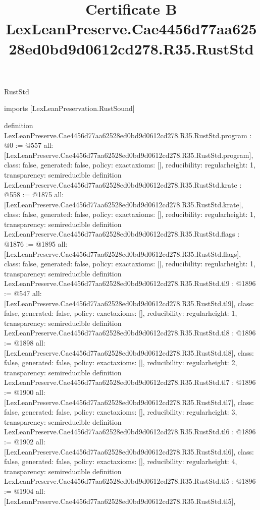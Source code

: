 \begin{lexlean}{RustStd}
\title{Certificate B LexLeanPreserve.Cae4456d77aa62528ed0bd9d0612cd278.R35.RustStd}
\begin{coremodule}
imports [LexLeanPreservation.RustSound]

definition LexLeanPreserve.Cae4456d77aa62528ed0bd9d0612cd278.R35.RustStd.program : @0 := @557 {
  all: [LexLeanPreserve.Cae4456d77aa62528ed0bd9d0612cd278.R35.RustStd.program],
  class: false,
  generated: false,
  policy: exact{axioms: []},
  reducibility: regular{height: 1},
  transparency: semireducible
}
definition LexLeanPreserve.Cae4456d77aa62528ed0bd9d0612cd278.R35.RustStd.krate : @558 := @1875 {
  all: [LexLeanPreserve.Cae4456d77aa62528ed0bd9d0612cd278.R35.RustStd.krate],
  class: false,
  generated: false,
  policy: exact{axioms: []},
  reducibility: regular{height: 1},
  transparency: semireducible
}
definition LexLeanPreserve.Cae4456d77aa62528ed0bd9d0612cd278.R35.RustStd.flags : @1876 := @1895 {
  all: [LexLeanPreserve.Cae4456d77aa62528ed0bd9d0612cd278.R35.RustStd.flags],
  class: false,
  generated: false,
  policy: exact{axioms: []},
  reducibility: regular{height: 1},
  transparency: semireducible
}
definition LexLeanPreserve.Cae4456d77aa62528ed0bd9d0612cd278.R35.RustStd.tl9 : @1896 := @547 {
  all: [LexLeanPreserve.Cae4456d77aa62528ed0bd9d0612cd278.R35.RustStd.tl9],
  class: false,
  generated: false,
  policy: exact{axioms: []},
  reducibility: regular{height: 1},
  transparency: semireducible
}
definition LexLeanPreserve.Cae4456d77aa62528ed0bd9d0612cd278.R35.RustStd.tl8 : @1896 := @1898 {
  all: [LexLeanPreserve.Cae4456d77aa62528ed0bd9d0612cd278.R35.RustStd.tl8],
  class: false,
  generated: false,
  policy: exact{axioms: []},
  reducibility: regular{height: 2},
  transparency: semireducible
}
definition LexLeanPreserve.Cae4456d77aa62528ed0bd9d0612cd278.R35.RustStd.tl7 : @1896 := @1900 {
  all: [LexLeanPreserve.Cae4456d77aa62528ed0bd9d0612cd278.R35.RustStd.tl7],
  class: false,
  generated: false,
  policy: exact{axioms: []},
  reducibility: regular{height: 3},
  transparency: semireducible
}
definition LexLeanPreserve.Cae4456d77aa62528ed0bd9d0612cd278.R35.RustStd.tl6 : @1896 := @1902 {
  all: [LexLeanPreserve.Cae4456d77aa62528ed0bd9d0612cd278.R35.RustStd.tl6],
  class: false,
  generated: false,
  policy: exact{axioms: []},
  reducibility: regular{height: 4},
  transparency: semireducible
}
definition LexLeanPreserve.Cae4456d77aa62528ed0bd9d0612cd278.R35.RustStd.tl5 : @1896 := @1904 {
  all: [LexLeanPreserve.Cae4456d77aa62528ed0bd9d0612cd278.R35.RustStd.tl5],
}
\end{coremodule}
\end{lexlean}
